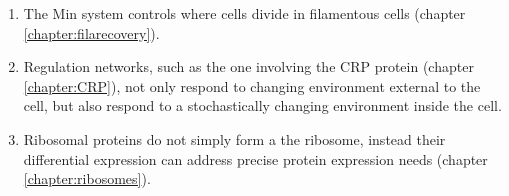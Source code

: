 \begin{enumerate}
    \item The Min system controls where cells divide in filamentous cells (chapter \ref{chapter:filarecovery}).
    \item Regulation networks, such as the one involving the CRP protein (chapter \ref{chapter:CRP}), not only respond to changing environment external to the cell, but also respond to a stochastically changing environment inside the cell.
    \item Ribosomal proteins do not simply form a the ribosome, instead their differential expression can address precise protein expression needs (chapter \ref{chapter:ribosomes}).
\end{enumerate}


